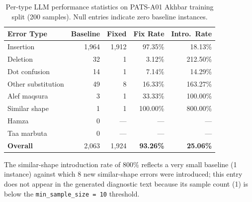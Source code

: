 \begin{table}[htbp]
  \centering
  \caption{Per-type LLM performance statistics on PATS-A01 Akhbar training
           split (200 samples). Null entries indicate zero baseline instances.}
  \label{tab:appb_stats}
  \begin{tabularx}{\textwidth}{lrrrr}
    \toprule
    \textbf{Error Type} & \textbf{Baseline} & \textbf{Fixed}
      & \textbf{Fix Rate} & \textbf{Intro.\ Rate} \\
    \midrule
    Insertion          & 1,964 & 1,912 & 97.35\% & 18.13\% \\
    Deletion           &    32 &     1 &  3.12\% & 212.50\% \\
    Dot confusion      &    14 &     1 &  7.14\% & 14.29\% \\
    Other substitution &    49 &     8 & 16.33\% & 163.27\% \\
    Alef maqsura       &     3 &     1 & 33.33\% & 100.00\% \\
    Similar shape      &     1 &     1 & 100.00\% & 800.00\% \\
    Hamza              &     0 &  ---  &  ---    &  --- \\
    Taa marbuta        &     0 &  ---  &  ---    &  --- \\
    \midrule
    \textbf{Overall}   & 2,063 & 1,924 & \textbf{93.26\%} & \textbf{25.06\%} \\
    \bottomrule
  \end{tabularx}
\end{table}

The similar-shape introduction rate of 800\% reflects a very small baseline
(1 instance) against which 8 new similar-shape errors were introduced; this
entry does not appear in the generated diagnostic text because its sample
count (1) is below the \texttt{min\_sample\_size = 10} threshold.
